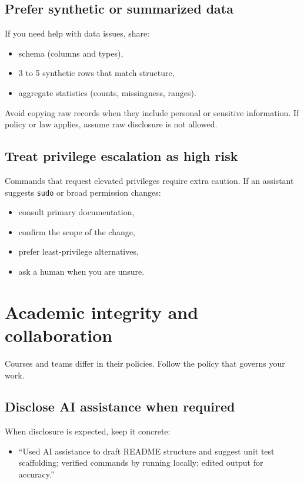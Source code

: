 \subsection{Prefer synthetic or summarized data}
If you need help with data issues, share:
\begin{itemize}[noitemsep]
  \item schema (columns and types),
  \item 3 to 5 synthetic rows that match structure,
  \item aggregate statistics (counts, missingness, ranges).
\end{itemize}

Avoid copying raw records when they include personal or sensitive information. If policy or law applies, assume raw disclosure is not allowed.

\subsection{Treat privilege escalation as high risk}
Commands that request elevated privileges require extra caution. If an assistant suggests \texttt{sudo} or broad permission changes:
\begin{itemize}[noitemsep]
  \item consult primary documentation,
  \item confirm the scope of the change,
  \item prefer least-privilege alternatives,
  \item ask a human when you are unsure.
\end{itemize}

\section{Academic integrity and collaboration}
Courses and teams differ in their policies. Follow the policy that governs your work.

\subsection{Disclose AI assistance when required}
When disclosure is expected, keep it concrete:
\begin{itemize}[noitemsep]
  \item ``Used AI assistance to draft README structure and suggest unit test scaffolding; verified commands by running locally; edited output for accuracy.''
\end{itemize}

